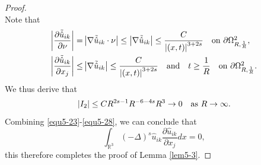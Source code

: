 \documentclass[reqno, 11pt]{amsart} %
\numberwithin{equation}{section}
\begin{document}
\begin{proof}
\begin{equation}
		\end{equation}
		Note that
		\begin{equation*}
			\begin{aligned}
				\left| \frac{\partial \tilde{\hat{u}}_{ik}}{\partial\nu}\right| =&\left| \nabla\tilde{\hat{u}}_{ik}\cdot\nu\right| \leq\left| \nabla\tilde{\hat{u}}_{ik}\right| \leq\frac{C}{\left|(x, t)\right|^{3+2s}}\quad \hbox{on $\partial\Omega_{R, \frac{1}{R}}^{2}$},\\
				\left| \frac{\partial \tilde{\hat{u}}_{ik}}{\partial x_{j}}\right| \leq&\left| \nabla\tilde{\hat{u}}_{ik}\right| \leq\frac{C}{\left|(x, t)\right|^{3+2s}}\quad \hbox{and}\quad t\geq\frac{1}{R}\quad  \hbox{on $\partial\Omega_{R, \frac{1}{R}}^{2}$}.
			\end{aligned}
		\end{equation*}		
		We thus derive that
		\begin{equation}\label{equ5-28}
			\left| 	I_{2}\right| \leq CR^{2s-1}R^{-6-4s}R^{3}\rightarrow0\quad \hbox{as $R\rightarrow\infty$}.
		\end{equation}
		Combining \eqref{equ5-23}-\eqref{equ5-28}, we can conclude that
		\begin{equation*}
			\int_{\mathbb{R}^{3}}(-\Delta)^{s} \hat{u}_{ik}\frac{\partial\hat{u}_{ik}}{\partial x_{j}}dx=0,
		\end{equation*}	
		this therefore completes the proof of Lemma \ref{lem5-3}.
	\end{proof}
	
\end{document}
